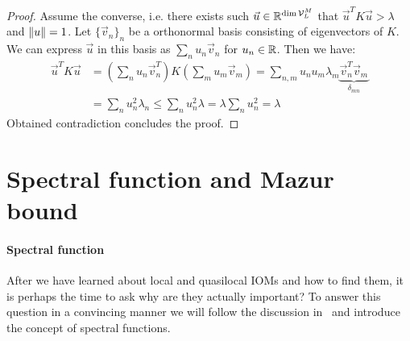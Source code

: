 \begin{proof}
  Assume the converse, i.e. there exists such \(\vec{u} \in \mathbb{R}^{\dim{\mathcal{V}_L^M}}\) that \(\vec{u}^T K \vec{u} > \lambda\)
  and \(\norm{u} = 1\).
  Let \(\{\vec{v}_n\}_n\) be a orthonormal basis consisting of eigenvectors of \(K\). We can express \(\vec{u}\) in this basis as
  \(\sum_n u_n \vec{v}_n\) for \(u_n \in \mathbb{R}\). Then we have:
  \begin{align*}    
    \vec{u}^T K \vec{u} &= \left( \sum_n u_n \vec{v}_n^{T} \right) K  \left( \sum_m u_m \vec{v}_m \right) 
    = \sum_{n,m} u_n u_m \lambda_m \underbrace{\vec{v}_n^{T} \vec{v}_m}_{\delta_{mn}} \\
    &= \sum_n u_n^2 \lambda_n \leq \sum_n u_n^2 \lambda = \lambda \sum_n u_n^2 = \lambda   
  \end{align*}
  Obtained contradiction concludes the proof.
\end{proof}


\section{Spectral function and Mazur bound\label{sec:spectral function}}

\paragraph{Spectral function}After we have learned about local and quasilocal IOMs and how to find them, it is perhaps the 
time to ask why are they actually important? To answer this question in a convincing manner we 
will follow the discussion in~\textcite{Vidmar2021} and introduce the concept of spectral
functions. 

